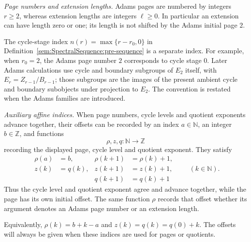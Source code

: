 \begin{definition}
\label{sem:SpectralSequence:page-indices}
\label{sem:SpectralSequence:page-level-convention}
\textit{Page numbers and extension lengths.} Adams pages are numbered by integers $r\geq2$, whereas extension lengths
are integers $\ell\geq0$. In particular an extension can have length
zero or one; its length is not shifted by the Adams initial page $2$.

The cycle-stage index $n(r)=\max\{r-r_0,0\}$ in
Definition~\ref{sem:SpectralSequence:pre-sequence} is a separate index.
For example, when $r_0=2$, the Adams page number $2$ corresponds to
cycle stage $0$. Later Adams calculations use cycle and boundary
subgroups of $E_2$ itself, with $E_r=Z_{r-1}/B_{r-1}$; those subgroups
are the images of the present ambient cycle and boundary subobjects
under projection to $E_2$. The convention is restated when the Adams
families are introduced.

\textit{Auxiliary affine indices.} When page numbers, cycle levels and quotient exponents advance together, their offsets can be recorded by an index $a\in\mathbb N$, an integer $b\in\mathbb Z$, and functions
\[
 \rho,z,q:\mathbb N\longrightarrow\mathbb Z
\]
recording the displayed page, cycle level and quotient exponent. They satisfy
\[
 \begin{aligned}
 \rho(a)&=b, & \rho(k+1)&=\rho(k)+1,\\
 z(k)&=q(k), & z(k+1)&=z(k)+1,\\
 &&q(k+1)&=q(k)+1
 \end{aligned}
 \qquad(k\in\mathbb N).
\]
Thus the cycle level and quotient exponent agree and advance together,
while the page has its own initial offset. The same function $\rho$
records that offset whether its argument denotes an Adams page number
or an extension length.

Equivalently, $\rho(k)=b+k-a$ and $z(k)=q(k)=q(0)+k$. The offsets
will always be given when these indices are used for pages or quotients.
\end{definition}
